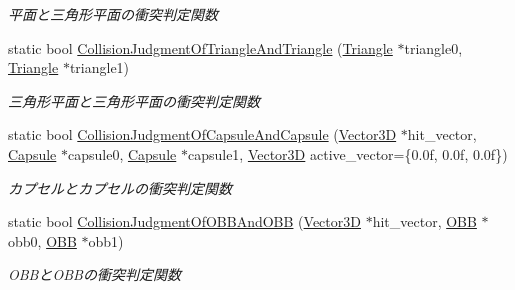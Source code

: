 \begin{DoxyCompactItemize}
\begin{DoxyCompactList}\small\item\em 平面と三角形平面の衝突判定関数 \end{DoxyCompactList}\item 
static bool \mbox{\hyperlink{class_collision_calculation_a3914ef51fc27f19911d3577abc56d9a5}{Collision\+Judgment\+Of\+Triangle\+And\+Triangle}} (\mbox{\hyperlink{class_triangle}{Triangle}} $\ast$triangle0, \mbox{\hyperlink{class_triangle}{Triangle}} $\ast$triangle1)
\begin{DoxyCompactList}\small\item\em 三角形平面と三角形平面の衝突判定関数 \end{DoxyCompactList}\item 
static bool \mbox{\hyperlink{class_collision_calculation_a6a66cb6f909ab75c51601ad8037cf806}{Collision\+Judgment\+Of\+Capsule\+And\+Capsule}} (\mbox{\hyperlink{class_vector3_d}{Vector3D}} $\ast$hit\+\_\+vector, \mbox{\hyperlink{class_capsule}{Capsule}} $\ast$capsule0, \mbox{\hyperlink{class_capsule}{Capsule}} $\ast$capsule1, \mbox{\hyperlink{class_vector3_d}{Vector3D}} active\+\_\+vector=\{0.\+0f, 0.\+0f, 0.\+0f\})
\begin{DoxyCompactList}\small\item\em カプセルとカプセルの衝突判定関数 \end{DoxyCompactList}\item 
static bool \mbox{\hyperlink{class_collision_calculation_a9123a8d6e1e1093bfe977cb5d3dbd6ec}{Collision\+Judgment\+Of\+O\+B\+B\+And\+O\+BB}} (\mbox{\hyperlink{class_vector3_d}{Vector3D}} $\ast$hit\+\_\+vector, \mbox{\hyperlink{class_o_b_b}{O\+BB}} $\ast$obb0, \mbox{\hyperlink{class_o_b_b}{O\+BB}} $\ast$obb1)
\begin{DoxyCompactList}\small\item\em O\+B\+Bと\+O\+B\+Bの衝突判定関数 \end{DoxyCompactList}\end{DoxyCompactItemize}
